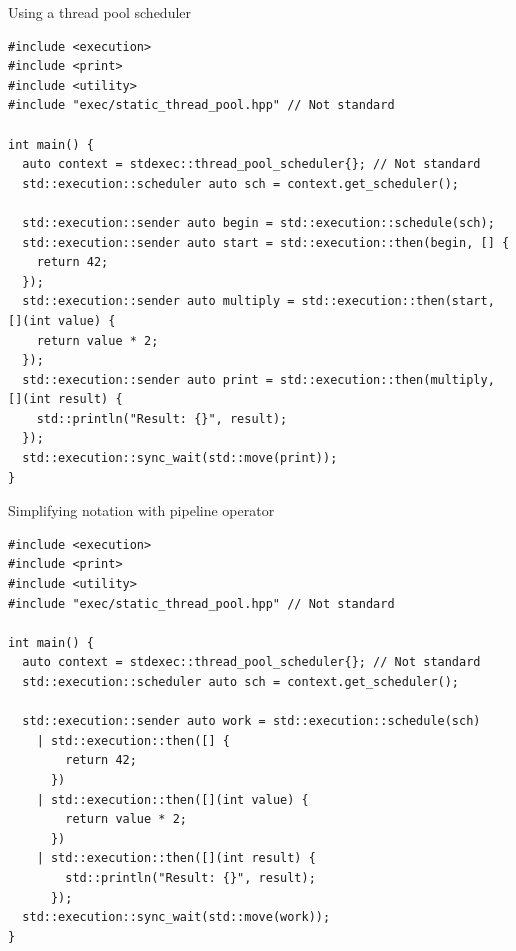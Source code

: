 \begin{frame}[t,fragile]{Using a thread pool scheduler}
\begin{lstlisting}
#include <execution>
#include <print>
#include <utility>
#include "exec/static_thread_pool.hpp" // Not standard

int main() {
  auto context = stdexec::thread_pool_scheduler{}; // Not standard
  std::execution::scheduler auto sch = context.get_scheduler();

  std::execution::sender auto begin = std::execution::schedule(sch);
  std::execution::sender auto start = std::execution::then(begin, [] {
    return 42;
  });
  std::execution::sender auto multiply = std::execution::then(start, [](int value) {
    return value * 2;
  });
  std::execution::sender auto print = std::execution::then(multiply, [](int result) {
    std::println("Result: {}", result);
  });
  std::execution::sync_wait(std::move(print));
}
\end{lstlisting}
\end{frame}

\begin{frame}[t,fragile]{Simplifying notation with pipeline operator}
\begin{lstlisting}
#include <execution>
#include <print>
#include <utility>
#include "exec/static_thread_pool.hpp" // Not standard

int main() {
  auto context = stdexec::thread_pool_scheduler{}; // Not standard
  std::execution::scheduler auto sch = context.get_scheduler();

  std::execution::sender auto work = std::execution::schedule(sch)
    | std::execution::then([] {
        return 42;
      })
    | std::execution::then([](int value) {
        return value * 2;
      })
    | std::execution::then([](int result) {
        std::println("Result: {}", result);
      });
  std::execution::sync_wait(std::move(work));
}
\end{lstlisting}
\end{frame}